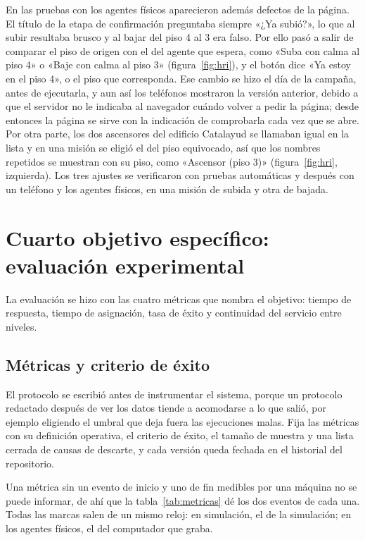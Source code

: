 En las pruebas con los agentes físicos aparecieron además defectos de la página. El título de la etapa de confirmación preguntaba siempre «¿Ya subió?», lo que al subir resultaba brusco y al bajar del piso 4 al 3 era falso. Por ello pasó a salir de comparar el piso de origen con el del agente que espera, como «Suba con calma al piso 4» o «Baje con calma al piso 3» (figura~\ref{fig:hri}), y el botón dice «Ya estoy en el piso 4», o el piso que corresponda. Ese cambio se hizo el día de la campaña, antes de ejecutarla, y aun así los teléfonos mostraron la versión anterior, debido a que el servidor no le indicaba al navegador cuándo volver a pedir la página; desde entonces la página se sirve con la indicación de comprobarla cada vez que se abre. Por otra parte, los dos ascensores del edificio Catalayud se llamaban igual en la lista y en una misión se eligió el del piso equivocado, así que los nombres repetidos se muestran con su piso, como «Ascensor (piso 3)» (figura~\ref{fig:hri}, izquierda). Los tres ajustes se verificaron con pruebas automáticas y después con un teléfono y los agentes físicos, en una misión de subida y otra de bajada.

\section{Cuarto objetivo específico: evaluación experimental}
\label{sec:protocolo}

La evaluación se hizo con las cuatro métricas que nombra el objetivo: tiempo de respuesta, tiempo de asignación, tasa de éxito y continuidad del servicio entre niveles.

\subsection{Métricas y criterio de éxito}

El protocolo se escribió antes de instrumentar el sistema, porque un protocolo redactado después de ver los datos tiende a acomodarse a lo que salió, por ejemplo eligiendo el umbral que deja fuera las ejecuciones malas. Fija las métricas con su definición operativa, el criterio de éxito, el tamaño de muestra y una lista cerrada de causas de descarte, y cada versión queda fechada en el historial del repositorio.

Una métrica sin un evento de inicio y uno de fin medibles por una máquina no se puede informar, de ahí que la tabla~\ref{tab:metricas} dé los dos eventos de cada una. Todas las marcas salen de un mismo reloj: en simulación, el de la simulación; en los agentes físicos, el del computador que graba.

